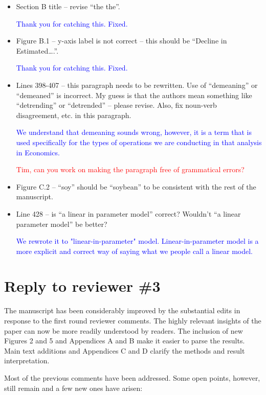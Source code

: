 \documentclass[
]{article}
\begin{document}
\begin{itemize}
\item Section B title – revise ``the the''.

\textcolor{blue}{Thank you for catching this. Fixed.}

\item Figure B.1 – y-axis label is not correct – this should be ``Decline in Estimated….''.

\textcolor{blue}{Thank you for catching this. Fixed.}

\item Lines 398-407 – this paragraph needs to be rewritten. Use of ``demeaning'' or ``demeaned'' is incorrect. My guess is that the authors mean something like ``detrending'' or ``detrended'' – please revise. Also, fix noun-verb disagreement, etc. in this paragraph.

\textcolor{blue}{We understand that demeaning sounds wrong, however, it is a term that is used specifically for the types of operations we are conducting in that analysis in Economics.}

\textcolor{red}{Tim, can you work on making the paragraph free of grammatical errors?}

\item Figure C.2 – ``soy'' should be ``soybean'' to be consistent with the rest of the manuscript.

\item Line 428 – is ``a linear in parameter model'' correct? Wouldn’t ``a linear parameter model'' be better?

\textcolor{blue}{We rewrote it to "linear-in-parameter" model. Linear-in-parameter model is a more explicit and correct way of saying what we people call a linear model.}

\end{itemize}

\section{Reply to reviewer \#3}

The manuscript has been considerably improved by the substantial edits in response to the first round reviewer comments. The highly relevant insights of the paper can now be more readily understood by readers. The inclusion of new Figures 2 and 5 and Appendices A and B make it easier to parse the results. Main text additions and Appendices C and D clarify the methods and result interpretation.

Most of the previous comments have been addressed. Some open points, however, still remain and a few new ones have arisen:
\end{document}
